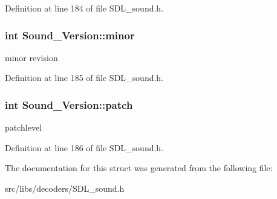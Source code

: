 Definition at line 184 of file S\-D\-L\-\_\-sound.\-h.

\hypertarget{structSound__Version_a095420931df560c545e0cf0d6fecf56a}{
\subsubsection[{minor}]{\setlength{\rightskip}{0pt plus 5cm}int {\bf Sound\-\_\-\-Version\-::minor}}}\label{structSound__Version_a095420931df560c545e0cf0d6fecf56a}
minor revision 

Definition at line 185 of file S\-D\-L\-\_\-sound.\-h.

\hypertarget{structSound__Version_a7ebc29f83c1a812ee24b556ad6dfc1f4}{
\subsubsection[{patch}]{\setlength{\rightskip}{0pt plus 5cm}int {\bf Sound\-\_\-\-Version\-::patch}}}\label{structSound__Version_a7ebc29f83c1a812ee24b556ad6dfc1f4}
patchlevel 

Definition at line 186 of file S\-D\-L\-\_\-sound.\-h.



The documentation for this struct was generated from the following file\-:\begin{DoxyCompactItemize}
\item 
src/libs/decoders/S\-D\-L\-\_\-sound.\-h\end{DoxyCompactItemize}
